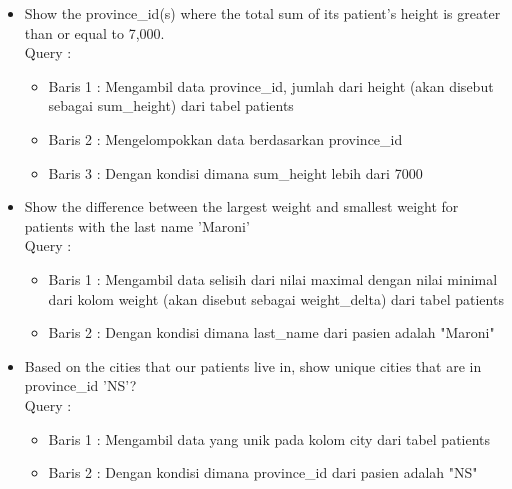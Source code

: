 \documentclass[]{article}
\begin{document}
\begin{itemize}
        \item Show the province\_id(s) where the total sum of its patient's height is greater than or equal to 7,000.
        \\Query :
        
        \begin{itemize}
            \item Baris 1 : Mengambil data province\_id, jumlah dari height (akan disebut sebagai sum\_height) dari tabel patients
            \item Baris 2 : Mengelompokkan data berdasarkan province\_id
            \item Baris 3 : Dengan kondisi dimana sum\_height lebih dari 7000
        \end{itemize}

        \item Show the difference between the largest weight and smallest weight for patients with the last name 'Maroni'
        \\Query :
        
        \begin{itemize}
            \item Baris 1 : Mengambil data selisih dari nilai maximal dengan nilai minimal dari kolom weight (akan disebut sebagai weight\_delta) dari tabel patients
            \item Baris 2 : Dengan kondisi dimana last\_name dari pasien adalah "Maroni"
        \end{itemize}

        \item Based on the cities that our patients live in, show unique cities that are in province\_id 'NS'?
        \\Query :
        
        \begin{itemize}
            \item Baris 1 : Mengambil data yang unik pada kolom city dari tabel patients  
            \item Baris 2 : Dengan kondisi dimana province\_id dari pasien adalah "NS"
        \end{itemize}

    \end{itemize}
\end{document}
